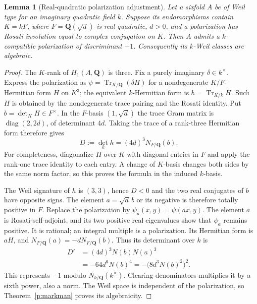 \documentclass[10pt,reqno]{article}
\theoremstyle{emphasizedplain}
\theoremstyle{emphasizeddefinition}
\theoremstyle{emphasizeddefinition}
\newtheorem{prelemma}{Lemma}
\DeclareMathOperator{\Tr}{Tr}
\newcommand{\Q}{\mathbf Q}
\begin{document}
\begin{prelemma}[Real-quadratic polarization adjustment]\label{p:quartic-scale}
Let a sixfold $A$ be of Weil type for an imaginary quadratic field $k$.
Suppose its endomorphisms contain $K=kF$, where $F=\Q(\sqrt d)$ is
real quadratic, $d>0$, and a polarization has Rosati involution equal
to complex conjugation on $K$. Then $A$ admits a $k$-compatible
polarization of discriminant $-1$. Consequently its $k$-Weil classes
are algebraic.
\end{prelemma}
\begin{proof}
The $K$-rank of $H_1(A,\Q)$ is three. Fix a purely imaginary
$\delta\in k^\times$. Express the polarization as
$\psi=\Tr_{K/\Q}(\delta H)$ for a nondegenerate $K/F$-Hermitian
form $H$ on $K^3$; the equivalent $k$-Hermitian form is
$h=\Tr_{K/k}H$. Such $H$ is obtained by the nondegenerate trace pairing
and the Rosati identity. Put $b=\det_K H\in F^\times$.
In the $F$-basis $(1,\sqrt d)$ the trace Gram matrix is
$\operatorname{diag}(2,2d)$, of determinant $4d$. Taking the trace of
a rank-three Hermitian form therefore gives
\[
 D:=\det_k h=(4d)^3N_{F/\Q}(b).
\]
For completeness, diagonalize $H$ over $K$ with diagonal entries in
$F$ and apply the rank-one trace identity to each entry. A change of
$K$-basis changes both sides by the same norm factor, so this proves
the formula in the induced $k$-basis.

The Weil signature of $h$ is $(3,3)$, hence $D<0$ and the two real
conjugates of $b$ have opposite signs. The element
$a=\sqrt d\,b$ or its negative is therefore totally positive in $F$.
Replace the polarization by $\psi_a(x,y)=\psi(ax,y)$. The element $a$
is Rosati-self-adjoint, and its two positive real eigenvalues show that
$\psi_a$ remains positive. It is rational; an integral multiple is a
polarization. Its Hermitian form is $aH$, and
$N_{F/\Q}(a)=-dN_{F/\Q}(b)$. Thus its determinant over $k$ is
\[
 \begin{split}
 D'&=(4d)^3N(b)N(a)^3\\
   &=-64d^6N(b)^4
    =-\bigl(8d^3N(b)^2\bigr)^2.
 \end{split}
\]
This represents $-1$ modulo $N_{k/\Q}(k^\times)$.
Clearing denominators multiplies it by a sixth power, also a norm.
The Weil space is independent of the polarization, so
Theorem~\ref{p:markman} proves its algebraicity.
\end{proof}
\end{document}
